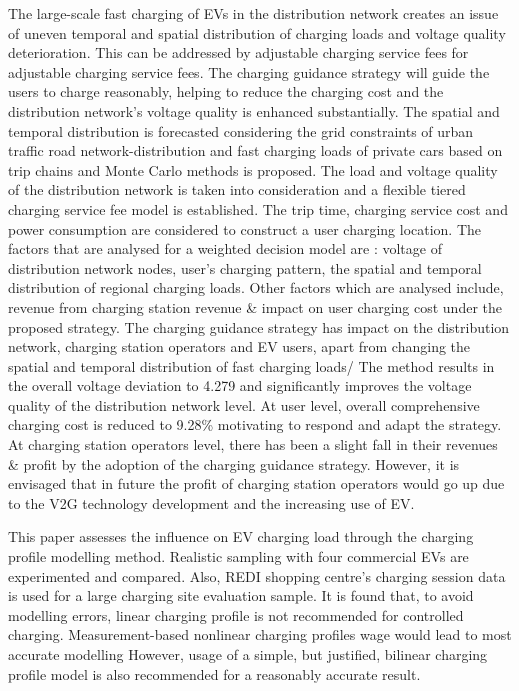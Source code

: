 	\cite{zhang2022fast} The large-scale fast charging of EVs in the distribution network creates an issue of uneven temporal and spatial distribution of charging loads and voltage quality deterioration.  This can be addressed by adjustable charging service fees for adjustable charging service fees. The charging guidance strategy will guide the users to charge reasonably, helping to reduce the charging cost and the distribution network’s voltage quality is enhanced substantially.
	The spatial and temporal distribution is forecasted considering the grid constraints of urban traffic road network-distribution and fast charging loads of private cars based on trip chains and Monte Carlo methods is proposed. The load and voltage quality of the distribution network is taken into consideration and a flexible tiered charging service fee model is established.  The trip time, charging service cost and power consumption are considered to construct a user charging location.  The factors that are analysed for a weighted decision model are : voltage of distribution network nodes, user’s charging pattern,  the spatial and temporal distribution of regional charging loads. Other factors which are analysed include, revenue from charging station revenue \& impact on user charging cost under the proposed strategy. 
	The charging guidance strategy has impact on the distribution network, charging station operators and EV users,  apart from changing the spatial and temporal distribution of fast charging loads/
	The method results in the overall voltage deviation to 4.279 and significantly  improves the  voltage quality of the distribution network level. At user level, overall comprehensive charging cost is reduced to 9.28\% motivating to respond and adapt the strategy. 
	At charging station operators level, there has been a slight fall in their revenues \& profit by the adoption of the charging guidance strategy. However, it is envisaged that in future the profit of charging station operators would go up due to the V2G technology development and the increasing use of EV. 
	
	
	
	\cite{simolin2022assessing} This paper assesses the influence on EV charging load through the charging profile modelling method.
	Realistic sampling with four commercial EVs are experimented and compared. Also, REDI shopping centre’s charging session data is used for a large charging site evaluation sample.
	It is found that, to avoid modelling errors, linear charging profile is not recommended for controlled charging.  Measurement-based nonlinear charging profiles wage would lead to most accurate modelling 
	However, usage of a simple, but justified, bilinear charging profile model is also recommended for a reasonably accurate result.
	
